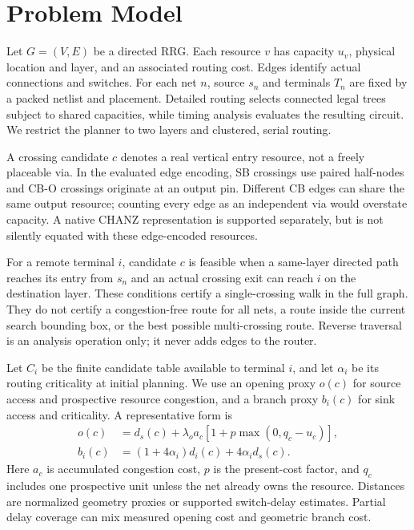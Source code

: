 \documentclass[conference,10pt]{IEEEtran}
\begin{document}
\clearpage
\section{Problem Model}
Let $G=(V,E)$ be a directed RRG. Each resource $v$ has capacity $u_v$, physical location and layer, and an associated routing cost. Edges identify actual connections and switches. For each net $n$, source $s_n$ and terminals $T_n$ are fixed by a packed netlist and placement. Detailed routing selects connected legal trees subject to shared capacities, while timing analysis evaluates the resulting circuit. We restrict the planner to two layers and clustered, serial routing.

A crossing candidate $c$ denotes a real vertical entry resource, not a freely placeable via. In the evaluated edge encoding, SB crossings use paired half-nodes and CB-O crossings originate at an output pin. Different CB edges can share the same output resource; counting every edge as an independent via would overstate capacity. A native CHANZ representation is supported separately, but is not silently equated with these edge-encoded resources.

For a remote terminal $i$, candidate $c$ is feasible when a same-layer directed path reaches its entry from $s_n$ and an actual crossing exit can reach $i$ on the destination layer. These conditions certify a single-crossing walk in the full graph. They do not certify a congestion-free route for all nets, a route inside the current search bounding box, or the best possible multi-crossing route. Reverse traversal is an analysis operation only; it never adds edges to the router.

Let $C_i$ be the finite candidate table available to terminal $i$, and let $\alpha_i$ be its routing criticality at initial planning. We use an opening proxy $o(c)$ for source access and prospective resource congestion, and a branch proxy $b_i(c)$ for sink access and criticality. A representative form is
\begin{align}
 o(c)&=d_s(c)+\lambda_o a_c[1+p\max(0,q_c-u_c)],\\
 b_i(c)&=(1+4\alpha_i)d_i(c)+4\alpha_i d_s(c).
\end{align}
Here $a_c$ is accumulated congestion cost, $p$ is the present-cost factor, and $q_c$ includes one prospective unit unless the net already owns the resource. Distances are normalized geometry proxies or supported switch-delay estimates. Partial delay coverage can mix measured opening cost and geometric branch cost.
\end{document}
